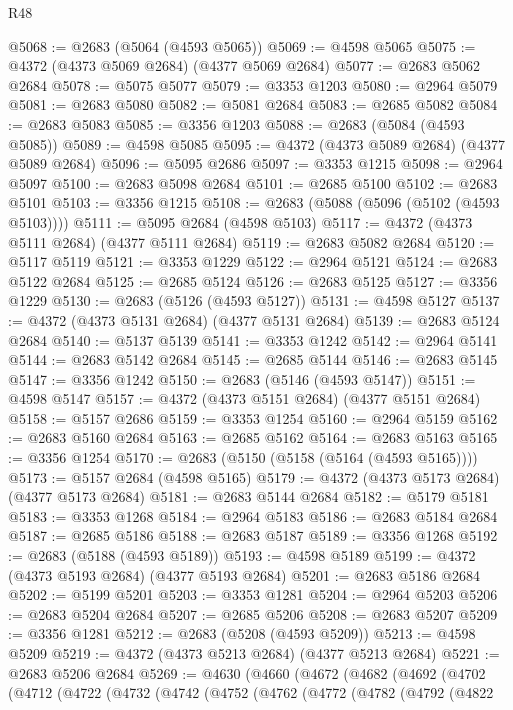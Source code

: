 \begin{lexlean}{R48}
\begin{coremodule}
@5068 := @2683 (@5064 (@4593 @5065))
@5069 := @4598 @5065
@5075 := @4372 (@4373 @5069 @2684) (@4377 @5069 @2684)
@5077 := @2683 @5062 @2684
@5078 := @5075 @5077
@5079 := @3353 @1203
@5080 := @2964 @5079
@5081 := @2683 @5080
@5082 := @5081 @2684
@5083 := @2685 @5082
@5084 := @2683 @5083
@5085 := @3356 @1203
@5088 := @2683 (@5084 (@4593 @5085))
@5089 := @4598 @5085
@5095 := @4372 (@4373 @5089 @2684) (@4377 @5089 @2684)
@5096 := @5095 @2686
@5097 := @3353 @1215
@5098 := @2964 @5097
@5100 := @2683 @5098 @2684
@5101 := @2685 @5100
@5102 := @2683 @5101
@5103 := @3356 @1215
@5108 := @2683 (@5088 (@5096 (@5102 (@4593 @5103))))
@5111 := @5095 @2684 (@4598 @5103)
@5117 := @4372 (@4373 @5111 @2684) (@4377 @5111 @2684)
@5119 := @2683 @5082 @2684
@5120 := @5117 @5119
@5121 := @3353 @1229
@5122 := @2964 @5121
@5124 := @2683 @5122 @2684
@5125 := @2685 @5124
@5126 := @2683 @5125
@5127 := @3356 @1229
@5130 := @2683 (@5126 (@4593 @5127))
@5131 := @4598 @5127
@5137 := @4372 (@4373 @5131 @2684) (@4377 @5131 @2684)
@5139 := @2683 @5124 @2684
@5140 := @5137 @5139
@5141 := @3353 @1242
@5142 := @2964 @5141
@5144 := @2683 @5142 @2684
@5145 := @2685 @5144
@5146 := @2683 @5145
@5147 := @3356 @1242
@5150 := @2683 (@5146 (@4593 @5147))
@5151 := @4598 @5147
@5157 := @4372 (@4373 @5151 @2684) (@4377 @5151 @2684)
@5158 := @5157 @2686
@5159 := @3353 @1254
@5160 := @2964 @5159
@5162 := @2683 @5160 @2684
@5163 := @2685 @5162
@5164 := @2683 @5163
@5165 := @3356 @1254
@5170 := @2683 (@5150 (@5158 (@5164 (@4593 @5165))))
@5173 := @5157 @2684 (@4598 @5165)
@5179 := @4372 (@4373 @5173 @2684) (@4377 @5173 @2684)
@5181 := @2683 @5144 @2684
@5182 := @5179 @5181
@5183 := @3353 @1268
@5184 := @2964 @5183
@5186 := @2683 @5184 @2684
@5187 := @2685 @5186
@5188 := @2683 @5187
@5189 := @3356 @1268
@5192 := @2683 (@5188 (@4593 @5189))
@5193 := @4598 @5189
@5199 := @4372 (@4373 @5193 @2684) (@4377 @5193 @2684)
@5201 := @2683 @5186 @2684
@5202 := @5199 @5201
@5203 := @3353 @1281
@5204 := @2964 @5203
@5206 := @2683 @5204 @2684
@5207 := @2685 @5206
@5208 := @2683 @5207
@5209 := @3356 @1281
@5212 := @2683 (@5208 (@4593 @5209))
@5213 := @4598 @5209
@5219 := @4372 (@4373 @5213 @2684) (@4377 @5213 @2684)
@5221 := @2683 @5206 @2684
@5269 := @4630
    (@4660
      (@4672
        (@4682
          (@4692
            (@4702
              (@4712
                (@4722
                  (@4732
                    (@4742
                      (@4752
                        (@4762
                          (@4772
                            (@4782
                              (@4792
                                (@4822

\end{coremodule}
\end{lexlean}
